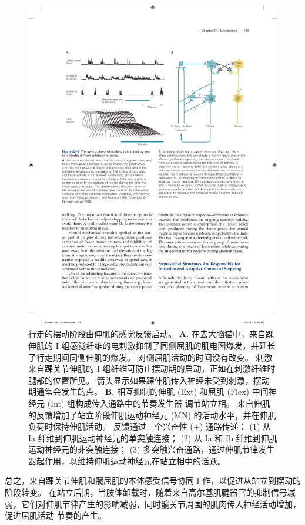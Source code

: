 \begin{figure}[htbp]
	\centering
	\includegraphics[width=0.9\linewidth]{chap33/fig_33_9}
	\caption{行走的摆动阶段由伸肌的感觉反馈启动。
		\textbf{A.} 在去大脑猫中，来自踝伸肌的 I 组感觉纤维的电刺激抑制了同侧屈肌的肌电图爆发，并延长了行走期间同侧伸肌的爆发。
		对侧屈肌活动的时间没有改变。
		刺激来自踝关节伸肌的 I 组纤维可防止摆动期的启动，正如在刺激纤维时腿部的位置所见。
		箭头显示如果踝伸肌传入神经未受到刺激，摆动期通常会发生的点\cite{whelan1995stimulation}。
		\textbf{B.} 相互抑制的伸肌 (Ext) 和屈肌 (Flex) 中间神经元 (Int) 组构成传入通路中的节奏发生器 调节站立相。
		来自伸肌的反馈增加了站立阶段伸肌运动神经元 (MN) 的活动水平，并在伸肌负荷时保持伸肌活动。 反馈通过三个兴奋性 (+) 通路传递：
		(1) 从 Ia 纤维到伸肌运动神经元的单突触连接；
		(2) 从 Ia 和 Ib 纤维到伸肌运动神经元的非突触连接；
		(3) 多突触兴奋通路，通过伸肌节律发生器起作用，以维持伸肌运动神经元在站立相中的活跃。}
	\label{fig:33_9}
\end{figure}


总之，来自踝关节伸肌和髋屈肌的本体感受信号协同工作，以促进从站立到摆动的阶段转变。
在站立后期，当肢体卸载时，随着来自高尔基肌腱器官的抑制信号减弱，它们对伸肌节律产生的影响减弱，同时髋关节周围的肌肉传入神经活动增加，促进屈肌活动 节奏的产生。


